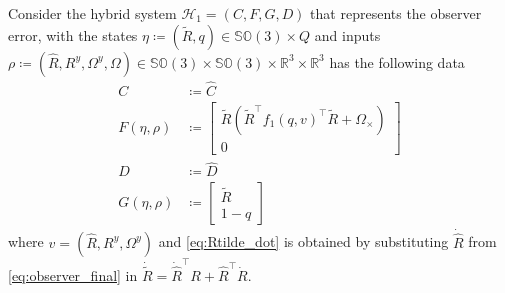 \documentclass{article}
\newcommand{\dom}{\text{dom }}
\newcommand{\SOthree}{\mathbb{SO}(3)}
\newcommand{\R}[1]{\mathbb{R}^{#1}}
\newcommand{\Omegay}{\Omega^y}
\newcommand{\brackets}[1]{\left(#1\right)}
\newcommand{\textblue}[1]{\textcolor{blue}{#1}}
\newcommand{\Rtilde}{\tilde{R}}
\newcommand{\normSOthree}[1]{{{\vert}#1 {\vert}_I}}
\begin{document}



Consider the hybrid system $\mathcal{H}_1 = (C, F, G, D)$ that represents the observer error, with the states $\eta \coloneqq (\Rtilde, q) \in \SOthree\times Q$ and inputs $\rho \coloneqq (\hat{R}, R^y, \Omegay, \Omega)\in\SOthree\times\SOthree\times \R{3}\times \R{3}$ has the following data
\begin{subequations}\label{eq:hybrid_observer_error}
\begin{align}
C&\coloneqq \hat{C}\\
F(\eta, \rho)&\coloneqq \begin{bmatrix}
    \Rtilde\brackets{\Rtilde^\top f_1(q, v)^\top \Rtilde + \Omega_\times}\\ 0\end{bmatrix} \label{eq:Rtilde_dot}\\
D &\coloneqq \hat{D}\\
G(\eta, \rho) &\coloneqq \begin{bmatrix}
\Rtilde \\ 1 - q
\end{bmatrix}
\end{align}
\end{subequations}
where $v = (\hat{R}, R^y, \Omegay)$ and \eqref{eq:Rtilde_dot} is obtained by substituting $\dot{\hat{R}}$ from \eqref{eq:observer_final} in $\dot{\Rtilde} = \dot{\hat{R}}^\top R + \hat{R}^\top \dot{R}$. 
\end{document}
